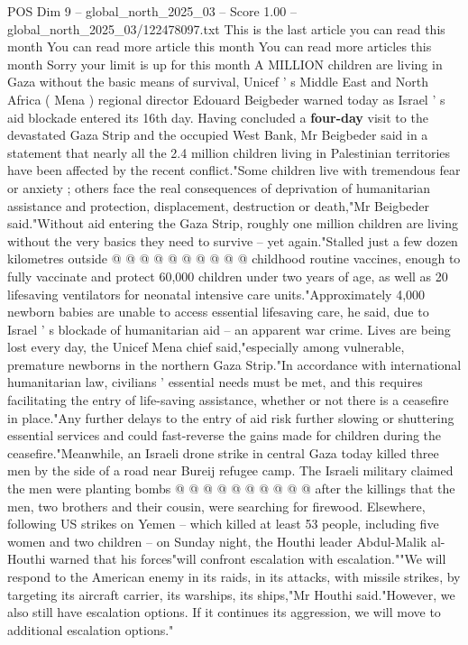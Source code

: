 \begin{textsample}{POS Dim 9 – global\_north\_2025\_03 – Score 1.00 – global\_north\_2025\_03/122478097.txt}  \label{ex:f9_pos_390}
This is the last article you can read this month You can read more article this month You can read more articles this month Sorry your limit is up for this month A MILLION children are living in Gaza without the basic means of survival, Unicef ' s Middle East and North Africa ( Mena ) regional director Edouard Beigbeder warned today as Israel ' s aid blockade entered its 16th day.
Having concluded a \textbf{four-day} visit to the devastated Gaza Strip and the occupied West Bank, Mr Beigbeder said in a statement that nearly all the 2.4 million children living in Palestinian territories have been affected by the recent conflict."Some children live with tremendous fear or anxiety ; others face the real consequences of deprivation of humanitarian assistance and protection, displacement, destruction or death,"Mr Beigbeder said."Without aid entering the Gaza Strip, roughly one million children are living without the very basics they need to survive -- yet again."Stalled just a few dozen kilometres outside @ @ @ @ @ @ @ @ @ @ childhood routine vaccines, enough to fully vaccinate and protect 60,000 children under two years of age, as well as 20 lifesaving ventilators for neonatal intensive care units."Approximately 4,000 newborn babies are unable to access essential lifesaving care, he said, due to Israel ' s blockade of humanitarian aid -- an apparent war crime.
Lives are being lost every day, the Unicef Mena chief said,"especially among vulnerable, premature newborns in the northern Gaza Strip."In accordance with international humanitarian law, civilians ' essential needs must be met, and this requires facilitating the entry of life-saving assistance, whether or not there is a ceasefire in place."Any further delays to the entry of aid risk further slowing or shuttering essential services and could fast-reverse the gains made for children during the ceasefire."Meanwhile, an Israeli drone strike in central Gaza today killed three men by the side of a road near Bureij refugee camp.
The Israeli military claimed the men were planting bombs @ @ @ @ @ @ @ @ @ @ after the killings that the men, two brothers and their cousin, were searching for firewood.
Elsewhere, following US strikes on Yemen -- which killed at least 53 people, including five women and two children -- on Sunday night, the Houthi leader Abdul-Malik al-Houthi warned that his forces"will confront escalation with escalation.""We will respond to the American enemy in its raids, in its attacks, with missile strikes, by targeting its aircraft carrier, its warships, its ships,"Mr Houthi said."However, we also still have escalation options.
If it continues its aggression, we will move to additional escalation options."

\end{textsample}
